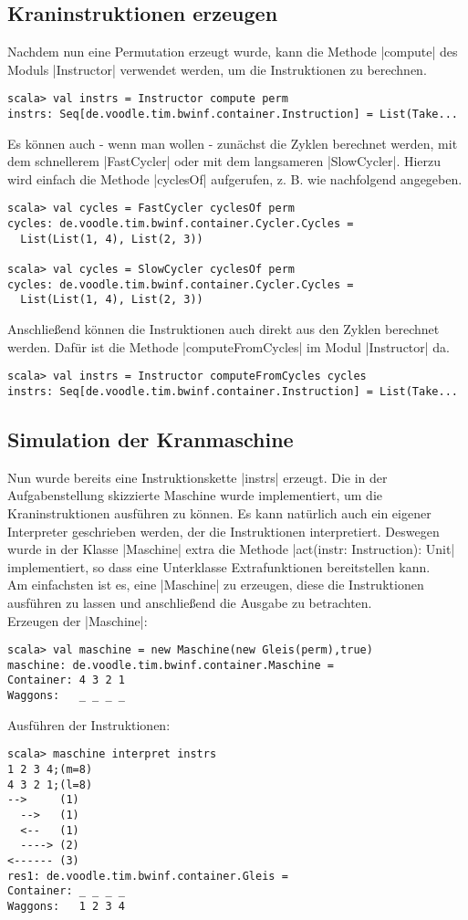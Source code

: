 \subsection{Kraninstruktionen erzeugen}
Nachdem nun eine Permutation erzeugt wurde, kann die Methode |compute| des Moduls |Instructor| verwendet werden, um die Instruktionen zu berechnen.
\begin{lstlisting}
scala> val instrs = Instructor compute perm
instrs: Seq[de.voodle.tim.bwinf.container.Instruction] = List(Take...
\end{lstlisting}
Es können auch - wenn man wollen - zunächst die Zyklen berechnet werden, mit dem schnellerem |FastCycler| oder mit dem langsameren |SlowCycler|.
Hierzu wird einfach die Methode |cyclesOf| aufgerufen, z. B. wie nachfolgend angegeben.
\begin{lstlisting}
scala> val cycles = FastCycler cyclesOf perm
cycles: de.voodle.tim.bwinf.container.Cycler.Cycles =
  List(List(1, 4), List(2, 3))

scala> val cycles = SlowCycler cyclesOf perm
cycles: de.voodle.tim.bwinf.container.Cycler.Cycles =
  List(List(1, 4), List(2, 3))
\end{lstlisting}
Anschließend können die Instruktionen auch direkt aus den Zyklen berechnet werden. Dafür ist die Methode |computeFromCycles| im Modul |Instructor| da.
\begin{lstlisting}
scala> val instrs = Instructor computeFromCycles cycles
instrs: Seq[de.voodle.tim.bwinf.container.Instruction] = List(Take...
\end{lstlisting}
\subsection{Simulation der Kranmaschine}
 Nun wurde bereits eine Instruktionskette |instrs| erzeugt.
 Die in der Aufgabenstellung skizzierte Maschine wurde implementiert, um die Kraninstruktionen ausführen zu können.
 Es kann natürlich auch ein eigener Interpreter geschrieben werden, der die Instruktionen interpretiert.
 Deswegen wurde in der Klasse |Maschine| extra die Methode |act(instr: Instruction): Unit| implementiert, so dass eine Unterklasse Extrafunktionen bereitstellen kann. \\
 Am einfachsten ist es, eine |Maschine| zu erzeugen, diese die Instruktionen ausführen zu lassen und anschließend die Ausgabe zu betrachten. \\
 Erzeugen der |Maschine|:
\begin{lstlisting}
scala> val maschine = new Maschine(new Gleis(perm),true)
maschine: de.voodle.tim.bwinf.container.Maschine = 
Container: 4 3 2 1
Waggons:   _ _ _ _
\end{lstlisting}
Ausführen der Instruktionen:
\begin{lstlisting}
scala> maschine interpret instrs
1 2 3 4;(m=8)
4 3 2 1;(l=8)
-->     (1)
  -->   (1)
  <--   (1)
  ----> (2)
<------ (3)
res1: de.voodle.tim.bwinf.container.Gleis = 
Container: _ _ _ _
Waggons:   1 2 3 4
\end{lstlisting}
